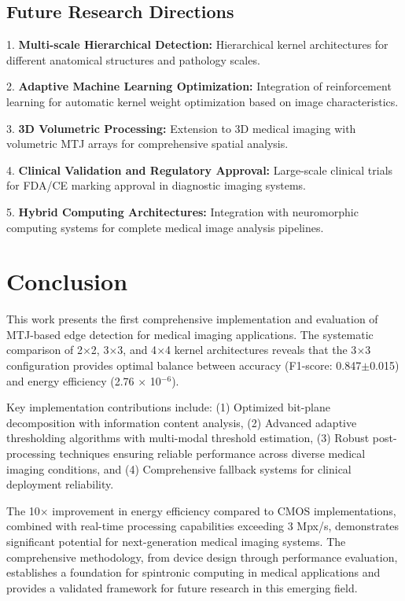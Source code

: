 \documentclass[conference]{IEEEtran}
\begin{document}
\subsection{Future Research Directions}

1. \textbf{Multi-scale Hierarchical Detection:} Hierarchical kernel architectures for different anatomical structures and pathology scales.

2. \textbf{Adaptive Machine Learning Optimization:} Integration of reinforcement learning for automatic kernel weight optimization based on image characteristics.

3. \textbf{3D Volumetric Processing:} Extension to 3D medical imaging with volumetric MTJ arrays for comprehensive spatial analysis.

4. \textbf{Clinical Validation and Regulatory Approval:} Large-scale clinical trials for FDA/CE marking approval in diagnostic imaging systems.

5. \textbf{Hybrid Computing Architectures:} Integration with neuromorphic computing systems for complete medical image analysis pipelines.

\section{Conclusion}

This work presents the first comprehensive implementation and evaluation of MTJ-based edge detection for medical imaging applications. The systematic comparison of 2$\times$2, 3$\times$3, and 4$\times$4 kernel architectures reveals that the 3$\times$3 configuration provides optimal balance between accuracy (F1-score: 0.847$\pm$0.015) and energy efficiency (2.76 $\times$ 10$^{-6}$). 

Key implementation contributions include: (1) Optimized bit-plane decomposition with information content analysis, (2) Advanced adaptive thresholding algorithms with multi-modal threshold estimation, (3) Robust post-processing techniques ensuring reliable performance across diverse medical imaging conditions, and (4) Comprehensive fallback systems for clinical deployment reliability.

The 10$\times$ improvement in energy efficiency compared to CMOS implementations, combined with real-time processing capabilities exceeding 3 Mpx/s, demonstrates significant potential for next-generation medical imaging systems. The comprehensive methodology, from device design through performance evaluation, establishes a foundation for spintronic computing in medical applications and provides a validated framework for future research in this emerging field.
\end{document}
